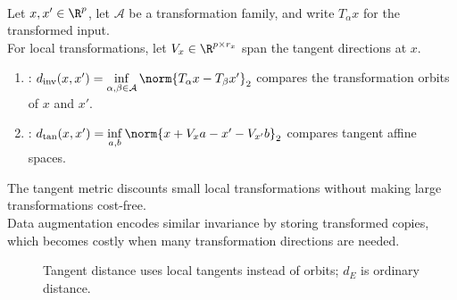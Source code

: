 \begin{method} \label{meth:sl-invariant-and-tangent-distance} \\
Let $x,x'\in\R^p$, let $\mathcal{A}$ be a transformation family, and write $T_\alpha x$ for the transformed input.\\
For local transformations, let $V_x\in\R^{p\times r_x}$ span the tangent directions at $x$.
\begin{enumerate}[label=(\roman*)]
\setlength{\itemsep}{0pt}
\item {}: $d_{\mathrm{inv}}(x,x')=\inf\limits_{\alpha,\beta\in\mathcal{A}}\norm{T_\alpha x-T_\beta x'}_2$ compares the transformation orbits of $x$ and $x'$.
\item {}: $d_{\mathrm{tan}}(x,x')=\inf\limits_{a,b}\norm{x+V_xa-x'-V_{x'}b}_2$ compares tangent affine spaces.
\end{enumerate}
The tangent metric discounts small local transformations without making large transformations cost-free.\\
Data augmentation encodes similar invariance by storing transformed copies, which becomes costly when many transformation directions are needed.
\end{method}

\begin{figure}[H]
\centering

\caption{Tangent distance uses \textcolor{red!75!black}{local tangents} instead of \textcolor{green!65!black}{orbits}; \textcolor{blue!70!black}{$d_E$} is ordinary distance.}
\label{fig:sl-tangent-distance-schematic}
\end{figure}

